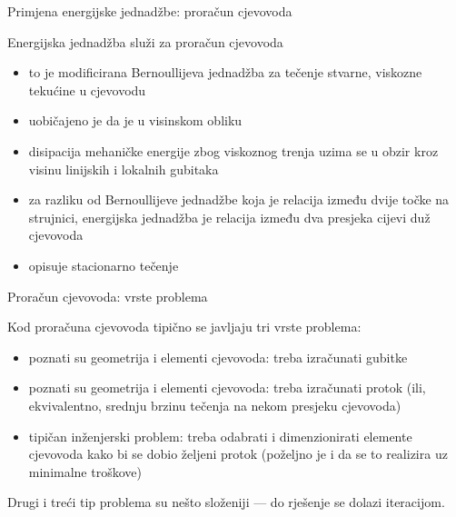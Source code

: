 \documentclass[croatian]{beamer}
\begin{document}
\begin{frame}{Primjena energijske jednadžbe: proračun cjevovoda}

\begin{alertblock}{Energijska jednadžba služi za proračun cjevovoda}
\begin{itemize}
\item to je modificirana Bernoullijeva jednadžba za tečenje stvarne, viskozne
tekućine u cjevovodu
\item uobičajeno je da je u visinskom obliku
\item disipacija mehaničke energije zbog viskoznog trenja uzima se u obzir
kroz visinu linijskih i lokalnih gubitaka 
\item za razliku od Bernoullijeve jednadžbe koja je relacija između dvije
točke na strujnici, energijska jednadžba je relacija između dva presjeka
cijevi duž cjevovoda
\item opisuje stacionarno tečenje
\end{itemize}
\end{alertblock}
\end{frame}

\begin{frame}{Proračun cjevovoda: vrste problema}

Kod proračuna cjevovoda tipično se javljaju tri vrste problema:
\begin{itemize}
\item poznati su geometrija i elementi cjevovoda: treba izračunati gubitke
\item poznati su geometrija i elementi cjevovoda: treba izračunati protok
(ili, ekvivalentno, srednju brzinu tečenja na nekom presjeku cjevovoda) 
\item tipičan inženjerski problem: treba odabrati i dimenzionirati elemente
cjevovoda kako bi se dobio željeni protok (poželjno je i da se to
realizira uz minimalne troškove)
\end{itemize}
Drugi i treći tip problema su nešto složeniji --- do rješenje se
dolazi iteracijom.
\end{frame}
\end{document}

